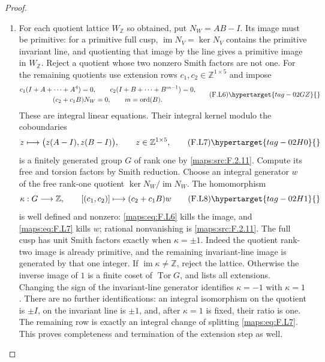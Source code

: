 \begin{proof}
\begin{enumerate}[label={$\langle1\rangle$\arabic*.}]
\item For each quotient lattice $W_{\mathbb Z}$ so obtained,
put $N_W=AB-I$.
Its image must be primitive: for a primitive full cusp,
$\operatorname{im}N_V=\ker N_V$ contains the primitive
invariant line, and quotienting that image by the line
gives a primitive image in $W_{\mathbb Z}$.
Reject a quotient whose two nonzero Smith factors are
not one.  For the remaining quotients use extension rows
$c_1,c_2\in\mathbb Z^{1\times5}$ and impose
\[
\begin{gathered}
 c_1(I+A+\cdots+A^4)=0,
 \qquad c_2(I+B+\cdots+B^{m-1})=0,\\
 (c_2+c_1B)N_W=0,
 \qquad m=\operatorname{ord}(B).
\end{gathered}
 \tag{F.L6}\hypertarget{tag-02GZ}{}\label{maps:eq:F.L6}
\]
These are integral linear equations.  Their integral kernel
modulo the coboundaries
\[
 z\longmapsto\bigl(z(A-I),z(B-I)\bigr),
 \qquad z\in\mathbb Z^{1\times5},
 \tag{F.L7}\hypertarget{tag-02H0}{}\label{maps:eq:F.L7}
\]
is a finitely generated group $G$ of rank one by \ref{maps:src:F.2.11}.
Compute its free and torsion factors by Smith reduction.
Choose an integral generator $w$ of the free rank-one
quotient $\ker N_W/\operatorname{im}N_W$.
The homomorphism
\[
 \kappa:G\longrightarrow\mathbb Z,
 \qquad [(c_1,c_2)]\longmapsto(c_2+c_1B)w
 \tag{F.L8}\hypertarget{tag-02H1}{}\label{maps:eq:F.L8}
\]
is well defined and nonzero: \eqref{maps:eq:F.L6} kills the image, and
\eqref{maps:eq:F.L7} kills $w$; rational nonvanishing is \ref{maps:src:F.2.11}.
The full cusp has unit Smith factors exactly when
$\kappa=\pm1$.
Indeed the quotient rank-two image is already primitive,
and the remaining invariant-line image is generated by
that one integer.
If $\operatorname{im}\kappa\ne\mathbb Z$, reject the
lattice.  Otherwise the inverse image of $1$ is a finite
coset of $\operatorname{Tor}G$, and lists all extensions.
Changing the sign of the invariant-line generator identifies
$\kappa=-1$ with $\kappa=1$.
There are no further identifications: an integral isomorphism
on the quotient is $\pm I$, on the invariant line is
$\pm1$, and, after $\kappa=1$ is fixed, their ratio is one.
The remaining row is exactly an integral change of splitting
\eqref{maps:eq:F.L7}.
This proves completeness and termination of the extension
step as well.



\end{enumerate}
\end{proof}




